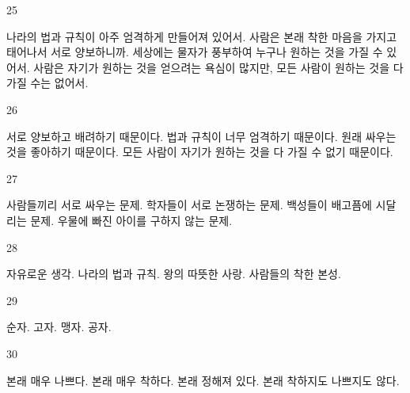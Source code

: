 \documentclass[fs9,seriesFre]{korfarm-base}
\begin{document}
\begin{kfSentenceUnit}{25}{}
\begin{kfChoices}
\kfChoice 나라의 법과 규칙이 아주 엄격하게 만들어져 있어서.
\kfChoice 사람은 본래 착한 마음을 가지고 태어나서 서로 양보하니까.
\kfChoice 세상에는 물자가 풍부하여 누구나 원하는 것을 가질 수 있어서.
\kfChoice 사람은 자기가 원하는 것을 얻으려는 욕심이 많지만, 모든 사람이 원하는 것을 다 가질 수는 없어서.
\end{kfChoices}
\end{kfSentenceUnit}

\begin{kfSentenceUnit}{26}{}
\begin{kfChoices}
\kfChoice 서로 양보하고 배려하기 때문이다.
\kfChoice 법과 규칙이 너무 엄격하기 때문이다.
\kfChoice 원래 싸우는 것을 좋아하기 때문이다.
\kfChoice 모든 사람이 자기가 원하는 것을 다 가질 수 없기 때문이다.
\end{kfChoices}
\end{kfSentenceUnit}

\begin{kfSentenceUnit}{27}{}
\begin{kfChoices}
\kfChoice 사람들끼리 서로 싸우는 문제.
\kfChoice 학자들이 서로 논쟁하는 문제.
\kfChoice 백성들이 배고픔에 시달리는 문제.
\kfChoice 우물에 빠진 아이를 구하지 않는 문제.
\end{kfChoices}
\end{kfSentenceUnit}

\begin{kfSentenceUnit}{28}{}
\begin{kfChoices}
\kfChoice 자유로운 생각.
\kfChoice 나라의 법과 규칙.
\kfChoice 왕의 따뜻한 사랑.
\kfChoice 사람들의 착한 본성.
\end{kfChoices}
\end{kfSentenceUnit}

\begin{kfSentenceUnit}{29}{}
\begin{kfChoices}
\kfChoice 순자.
\kfChoice 고자.
\kfChoice 맹자.
\kfChoice 공자.
\end{kfChoices}
\end{kfSentenceUnit}

\begin{kfSentenceUnit}{30}{}
\begin{kfChoices}
\kfChoice 본래 매우 나쁘다.
\kfChoice 본래 매우 착하다.
\kfChoice 본래 정해져 있다.
\kfChoice 본래 착하지도 나쁘지도 않다.
\end{kfChoices}
\end{kfSentenceUnit}
\end{document}
